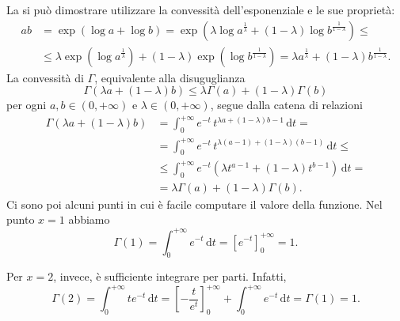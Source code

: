 La si può dimostrare utilizzare la convessità dell'esponenziale e le sue proprietà:
\begin{equation*}
\begin{split}
	ab 
	& = 
	\exp \left( \log a + \log b \right) = 
	\exp \left({ \lambda \log a^ \frac{1}{ \lambda} + \left(1- \lambda \right) \log b^ \frac{1}{1- \lambda}} \right) \leq 
	\\ & \leq \lambda \exp \left( \log a^ \frac{1}{ \lambda} \right) + \left(1- \lambda \right) \exp \left( \log b^ \frac{1}{1- \lambda} \right) = 
	\lambda a^ \frac{1}{ \lambda} + \left(1- \lambda \right) b^ \frac{1}{1- \lambda}.
\end{split}
\end{equation*}
La convessità di $ \Gamma$, equivalente alla disuguglianza
\begin{equation*}
	\Gamma( \lambda a + (1- \lambda) b) \leq \lambda \Gamma(a) + (1- \lambda) \Gamma(b)
\end{equation*}
per ogni $a,b \in \left(0,+ \infty \right)$ e $ \lambda \in \left(0,+ \infty \right)$, segue dalla catena di relazioni
\begin{equation*}
\begin{split}
	\Gamma( \lambda a + (1- \lambda) b) 
	&= 
	\int_{0}^{+ \infty}e^{-t} \,t^{ \lambda a + (1- \lambda) b -1} \, \mathrm{d}t = 
	\\ &= 
	\int_{0}^{+ \infty}e^{-t} \,t^{ \lambda (a-1) + (1- \lambda) (b-1)} \, \mathrm{d}t \leq
	\\ &\leq 
	\int_{0}^{+ \infty}e^{-t} \left( \lambda t^{a-1} + (1- \lambda) t^{b-1} \right) \, \mathrm{d}t =
	\\ &=
	\lambda \Gamma(a) + (1- \lambda) \Gamma(b).
\end{split}
\end{equation*}
Ci sono poi alcuni punti in cui è facile computare il valore della funzione.
Nel punto $x=1$ abbiamo 
\begin{equation*}
	\Gamma(1)= 
	\int_{0}^{+ \infty}e^{-t} \, \mathrm{d}t= \left[ e^{-t} \right]_0^{+ \infty}=
	1.
\end{equation*}

Per $x=2$, invece, è sufficiente integrare per parti. Infatti, 
\begin{equation*}
	\Gamma(2) =
	\int_{0}^{+ \infty} te^{-t} \, \mathrm{d}t =
	\left[ - \frac{t}{e^t} \right]_0^{+ \infty} + \int_{0}^{+ \infty} e^{-t} \, \mathrm{d}t =
	\Gamma(1) =
	1.
\end{equation*}

